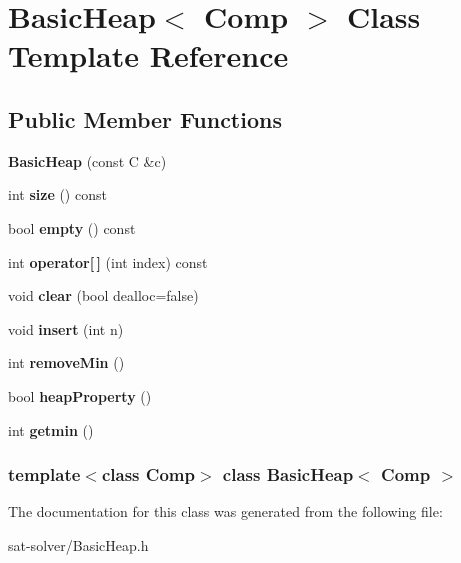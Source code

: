 \hypertarget{classBasicHeap}{\section{\-Basic\-Heap$<$ \-Comp $>$ \-Class \-Template \-Reference}
\label{classBasicHeap}
}
\subsection*{\-Public \-Member \-Functions}
\begin{DoxyCompactItemize}
\item 
\hypertarget{classBasicHeap_aa3f0020149d0aaf2b42ed3cdafb931ec}{{\bfseries \-Basic\-Heap} (const \-C \&c)}\label{classBasicHeap_aa3f0020149d0aaf2b42ed3cdafb931ec}

\item 
\hypertarget{classBasicHeap_a071a3905e6b0de73a50f2422bee9af27}{int {\bfseries size} () const }\label{classBasicHeap_a071a3905e6b0de73a50f2422bee9af27}

\item 
\hypertarget{classBasicHeap_ac25c1ff043cb5d20b3a01bcc6d68a14f}{bool {\bfseries empty} () const }\label{classBasicHeap_ac25c1ff043cb5d20b3a01bcc6d68a14f}

\item 
\hypertarget{classBasicHeap_a2f91671fe031802ef447a482b7278410}{int {\bfseries operator\mbox{[}$\,$\mbox{]}} (int index) const }\label{classBasicHeap_a2f91671fe031802ef447a482b7278410}

\item 
\hypertarget{classBasicHeap_a9f7018ff27785f5ca02fce999af35c05}{void {\bfseries clear} (bool dealloc=false)}\label{classBasicHeap_a9f7018ff27785f5ca02fce999af35c05}

\item 
\hypertarget{classBasicHeap_a0fb5534dde03067768cdcf19e8391e04}{void {\bfseries insert} (int n)}\label{classBasicHeap_a0fb5534dde03067768cdcf19e8391e04}

\item 
\hypertarget{classBasicHeap_a1dbb1f64bf5bc814515abec8a3468fbb}{int {\bfseries remove\-Min} ()}\label{classBasicHeap_a1dbb1f64bf5bc814515abec8a3468fbb}

\item 
\hypertarget{classBasicHeap_a0e5ce2b16a16ad8a5f33d175cb616a05}{bool {\bfseries heap\-Property} ()}\label{classBasicHeap_a0e5ce2b16a16ad8a5f33d175cb616a05}

\item 
\hypertarget{classBasicHeap_a422eda96fd4ff2f8813767f335f1ae8c}{int {\bfseries getmin} ()}\label{classBasicHeap_a422eda96fd4ff2f8813767f335f1ae8c}

\end{DoxyCompactItemize}
\subsubsection*{template$<$class Comp$>$ class Basic\-Heap$<$ Comp $>$}



\-The documentation for this class was generated from the following file\-:\begin{DoxyCompactItemize}
\item 
sat-\/solver/\-Basic\-Heap.\-h\end{DoxyCompactItemize}
